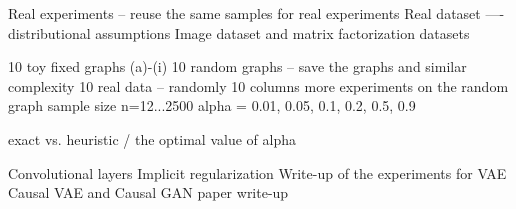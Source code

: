 Real experiments -- reuse the same samples for real experiments
Real dataset —- distributional assumptions
Image dataset and matrix factorization datasets

10 toy fixed graphs (a)-(i)
10 random graphs -- save the graphs and similar complexity
10 real data -- randomly 10 columns
more experiments on the random graph
sample size n=12...2500
alpha = 0.01, 0.05, 0.1, 0.2, 0.5, 0.9

exact vs. heuristic / the optimal value of alpha

Convolutional layers
Implicit regularization
Write-up of the experiments for VAE
Causal VAE and Causal GAN paper write-up
